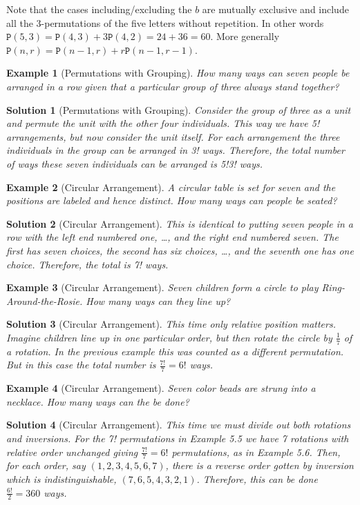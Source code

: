 \documentclass[12pt, letterpaper, onecolumn, conference, final]{IEEEtran}
\theoremstyle{definition}
\theoremstyle{plain}
\newtheorem{example}{Example}[section]
\newtheorem{solution}{Solution}[section]
\begin{document}
\noindent
Note that the cases including/excluding the $b$ are mutually exclusive and include all the 3-permutations of the five letters without repetition. In other words $\mathtt{P}(5,3) = \mathtt{P}(4,3) + 3\mathtt{P}(4,2) = 24 + 36 = 60$. More generally $\mathtt{P}(n,r) = \mathtt{P}(n-1,r) + r\mathtt{P}(n-1,r-1)$.

\begin{example}[Permutations with Grouping]
How many ways can seven people be arranged in a row given that a particular group of three always stand together?
\end{example}
\begin{solution}[Permutations with Grouping]
Consider the group of three as a unit and permute the unit with the other four individuals. This way we have 5! arrangements, but now consider the unit itself. For each arrangement the three individuals in the group can be arranged in 3! ways. Therefore, the total number of ways these seven individuals can be arranged is 5!3! ways.
\end{solution}

\begin{example}[Circular Arrangement]
A circular table is set for seven and the positions are labeled and hence distinct. How many ways can people be seated?
\end{example}
\begin{solution}[Circular Arrangement]
This is identical to putting seven people in a row with the left end numbered one, \dots, and the right end numbered seven. The first has seven choices, the second has six choices, \dots, and the seventh one has one choice. Therefore, the total is 7! ways.
\end{solution}

\begin{example}[Circular Arrangement]
Seven children form a circle to play Ring-Around-the-Rosie. How many ways can they line up?
\end{example}
\begin{solution}[Circular Arrangement]
This time only relative position matters. Imagine children line up in one particular order, but then rotate the circle by $\frac{1}{7}$ of a rotation. In the previous example this was counted as a different permutation. But in this case the total number is $\frac{7!}{7} = 6!$ ways.
\end{solution}

\newpage
\begin{example}[Circular Arrangement]
Seven color beads are strung into a necklace. How many ways can the be done?
\end{example}
\begin{solution}[Circular Arrangement]
This time we must divide out both rotations and inversions. For the 7! permutations in Example 5.5 we have 7 rotations with relative order unchanged giving $\frac{7!}{7}=6!$ permutations, as in Example 5.6. Then, for each order, say $(1,2,3,4,5,6,7)$, there is a reverse order gotten by inversion which is indistinguishable, $(7,6,5,4,3,2,1)$. Therefore, this can be done $\frac{6!}{2}=360$ ways.
\end{solution}
\end{document}
